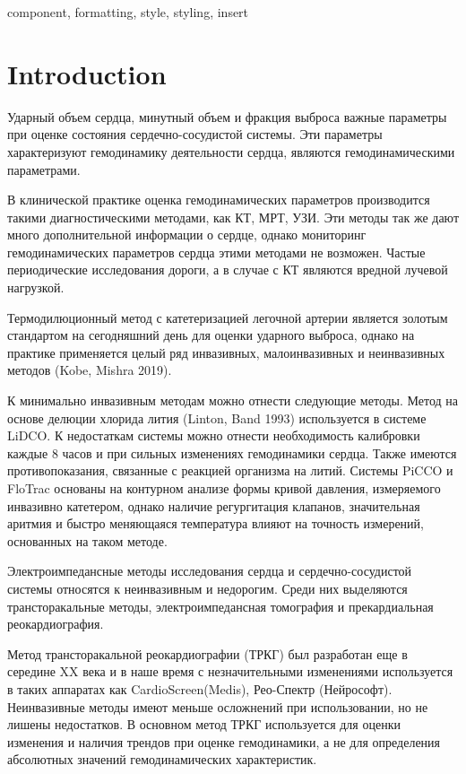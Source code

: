 \documentclass[conference]{IEEEtran}
\begin{document}
\begin{IEEEkeywords}
component, formatting, style, styling, insert
\end{IEEEkeywords}

\section{Introduction}

Ударный объем сердца, минутный объем и фракция выброса важные параметры при оценке состояния сердечно-сосудистой системы.
Эти параметры характеризуют гемодинамику деятельности сердца, являются гемодинамическими параметрами.

В клинической практике оценка гемодинамических параметров производится такими диагностическими методами, как КТ, МРТ, УЗИ.
Эти методы так же дают много дополнительной информации о сердце, однако мониторинг гемодинамических параметров сердца этими методами не возможен.
Частые периодические исследования дороги, а в случае с КТ являются вредной лучевой нагрузкой.

Термодилюционный метод с катетеризацией легочной артерии является золотым стандартом на сегодняшний день для оценки ударного выброса, однако  на практике применяется целый ряд инвазивных, малоинвазивных и неинвазивных методов (Kobe, Mishra 2019).

К минимально инвазивным методам можно отнести следующие методы.
Метод на основе делюции хлорида лития (Linton, Band 1993) используется в системе LiDCO.
К недостаткам системы можно отнести необходимость калибровки каждые 8 часов и при сильных изменениях гемодинамики сердца.
Также имеются противопоказания, связанные с реакцией организма на литий.
Системы PiCCO и FloTrac основаны на контурном анализе формы кривой давления, измеряемого инвазивно катетером, однако наличие регургитация клапанов, значительная аритмия и быстро меняющаяся температура влияют на точность измерений, основанных на таком методе.

Электроимпедансные методы исследования сердца и сердечно-сосудистой системы относятся к неинвазивным и недорогим.
Среди них выделяются трансторакальные методы, электроимпедансная томография и прекардиальная реокардиография.

Метод трансторакальной реокардиографии (ТРКГ) был разработан еще в середине XX века и в наше время с незначительными изменениями используется в таких аппаратах как CardioScreen(Medis), Рео-Спектр (Нейрософт).
Неинвазивные методы имеют меньше осложнений при использовании, но не лишены недостатков.
В основном метод ТРКГ используется для оценки изменения и наличия трендов при оценке гемодинамики, а не для определения абсолютных значений гемодинамических характеристик.
\end{document}
